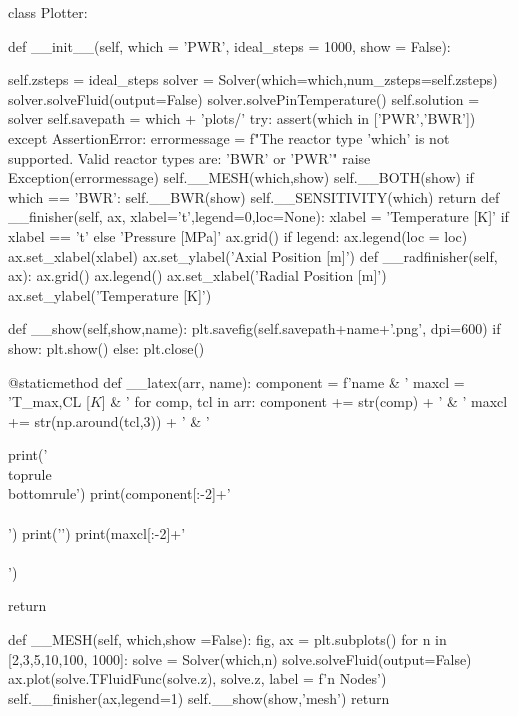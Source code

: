 \documentclass{article}
\begin{document}
\begin{python}
class Plotter:
    
    def __init__(self, which = 'PWR', ideal_steps = 1000, show = False):

        self.zsteps = ideal_steps
        solver = Solver(which=which,num_zsteps=self.zsteps)
        solver.solveFluid(output=False)
        solver.solvePinTemperature()
        self.solution = solver
        self.savepath = which + 'plots/'
        try:
            assert(which in ['PWR','BWR'])
        except AssertionError:
            errormessage = f"The reactor type '{which}' is not supported. Valid reactor types are: 'BWR' or 'PWR'"
            raise Exception(errormessage)
        self.__MESH(which,show)
        self.__BOTH(show)
        if which == 'BWR':
            self.__BWR(show)
        self.__SENSITIVITY(which)
        return
    def __finisher(self, ax, xlabel='t',legend=0,loc=None):
        xlabel = 'Temperature  [K]' if xlabel == 't' else 'Pressure  [MPa]'
        ax.grid()
        if legend:
            ax.legend(loc = loc)
        ax.set_xlabel(xlabel)
        ax.set_ylabel('Axial Position  [m]')
    def __radfinisher(self, ax):
        ax.grid()
        ax.legend()
        ax.set_xlabel('Radial Position  [m]')
        ax.set_ylabel('Temperature  [K]')

    
    def __show(self,show,name):
        plt.savefig(self.savepath+name+'.png', dpi=600)
        if show:
            plt.show()
        else:
            plt.close()
        
    @staticmethod   
    def __latex(arr, name):
        component = f'{name} & '
        maxcl = 'T_{max,CL}  [$K$] & '
        for comp, tcl in arr:
            component += str(comp) + ' & '
            maxcl += str(np.around(tcl,3)) + ' & '

        print('\\toprule\n\\bottomrule')
        print(component[:-2]+'\\\\')
        print('\hline')
        print(maxcl[:-2]+'\\\\')
        
        return


    def __MESH(self, which,show =False):
        fig, ax = plt.subplots()
        for n in [2,3,5,10,100, 1000]:
            solve = Solver(which,n)
            solve.solveFluid(output=False)
            ax.plot(solve.TFluidFunc(solve.z), solve.z, label = f'{n} Nodes')
        self.__finisher(ax,legend=1)
        self.__show(show,'mesh')
        return


\end{python}
\end{document}
